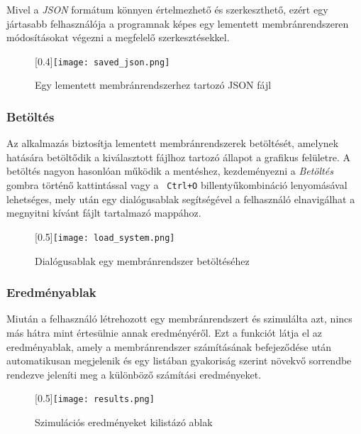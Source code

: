 Mivel a \textit{JSON} formátum könnyen értelmezhető és szerkeszthető, ezért egy jártasabb felhasználója a programnak képes egy lementett membránrendszeren módosításokat végezni a megfelelő szerkesztésekkel. 


\begin{figure}[H]
	\centering
	\scalebox{0.4}[0.4]{\texttt{[image: saved\_json.png]}}
	\caption{Egy lementett membránrendszerhez tartozó JSON fájl  \protect\footnotemark}
	\label{fig:saved_json}
\end{figure}


\subsubsection{Betöltés}

Az alkalmazás biztosítja lementett membránrendszerek betöltését, amelynek hatására betöltődik a kiválasztott fájlhoz tartozó állapot a grafikus felületre.
A betöltés nagyon hasonlóan működik a mentéshez, kezdeményezni a \textit{Betöltés} gombra történő kattintással vagy a \verb| Ctrl+O| billentyűkombináció lenyomásával lehetséges, mely után egy dialógusablak segítségével a felhasználó elnavigálhat a megnyitni kívánt fájlt tartalmazó mappához.

\begin{figure}[H]
	\centering
	\scalebox{0.5}[0.5]{\texttt{[image: load\_system.png]}}
	\caption{Dialógusablak egy membránrendszer betöltéséhez}
	\label{fig:load_system}
\end{figure}

\subsubsection{Eredményablak}

Miután a felhasználó létrehozott egy membránrendszert és szimulálta azt, nincs más hátra mint értesülnie annak eredményéről.  Ezt a funkciót látja el az eredményablak, amely a membránrendszer számításának befejeződése után automatikusan megjelenik és egy listában gyakoriság szerint növekvő sorrendbe rendezve jeleníti meg a különböző számítási eredményeket.

\begin{figure}[H]
	\centering
	\scalebox{0.5}[0.5]{\texttt{[image: results.png]}}
	\caption{Szimulációs eredményeket kilistázó ablak}
	\label{fig:load_system}
\end{figure}

